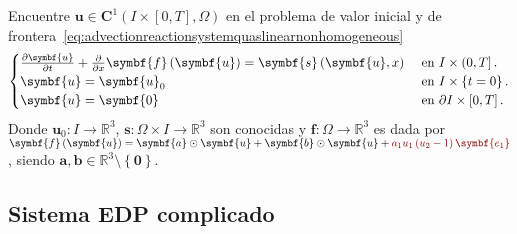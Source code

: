 Encuentre
\begin{math}
	\symbf{u}\in
	\symbf{C}^{1}\left(I\times\left[0,T\right],\Omega\right)
\end{math}
en el problema de valor inicial y de frontera~\eqref{eq:advectionreactionsystemquaslinearnonhomogeneous}
\begin{equation}\label{eq:advectionreactionsystemquaslinearnonhomogeneous}
	\begin{cases}
		\diffp{\symbf{u}}{t}+\diffp{}{x}\symbf{f}\left(\symbf{u}\right)=
		\symbf{s}\left(\symbf{u},x\right) & \text{ en }I\times\left(0,T\right].          \\
		\symbf{u}                                                      =
		\symbf{u}_{0}                     & \text{ en }I\times\left\{t=0\right\}.        \\
		\symbf{u}                                                       =
		\symbf{0}                         & \text{ en }\partial I\times\left[0,T\right].
	\end{cases}
\end{equation}
Donde
\begin{math}
	\symbf{u}_{0}\colon I\to
	\mathbb{R}^{3}
\end{math},
\begin{math}
	\symbf{s}\colon \Omega\times I\to
	\mathbb{R}^{3}
\end{math}
son conocidas y
\begin{math}
	\symbf{f}\colon\Omega\to
	\mathbb{R}^{3}
\end{math}
es dada por
\begin{math}
	\symbf{f}\left(\symbf{u}\right)=
	\symbf{a}\odot\symbf{u}+
	\symbf{b}\odot\symbf{u}+
	\mathcolor{DarkRed}{a_{1}u_{1}\left(u_{2}-1\right)\symbf{e_{1}}}
\end{math},
siendo $\symbf{a},\symbf{b}\in\mathbb{R}^{3}\setminus\left\{\symbf{0}\right\}$.

\subsection*{\color{DarkRed}Sistema EDP complicado}

